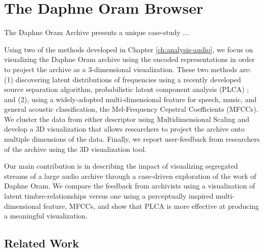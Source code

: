 \documentclass[a4paper,10pt,final]{ThesisStyle}
\begin{document}
\section{The Daphne Oram Browser}

The Daphne Oram Archive presents a unique case-study ...

Using two of the methods developed in Chapter \ref{ch:analysis-audio}, we focus on visualizing the Daphne Oram archive using the encoded representations in order to project the archive as a 3-dimensional visualization.  These two methods are: (1) discovering latent distributions of frequencies using a recently developed source separation algorithm, probabilistic latent component analysis (PLCA) \cite{SmaragdisRajShashanka}; and (2), using a widely-adopted multi-dimensional feature for speech, music, and general acoustic classification, the Mel-Frequency Cepstral Coefficients (MFCCs).  We cluster the data from either descriptor using Multidimensional Scaling and develop a 3D visualization that allows researchers to project the archive onto multiple dimensions of the data.  Finally, we report user-feedback from researchers of the archive using the 3D visualization tool.  

Our main contribution is in describing the impact of visualizing segregated streams of a large audio archive through a case-driven exploration of the work of Daphne Oram.  We compare the feedback from archivists using a visualization of latent timbre-relationships versus one using a perceptually inspired multi-dimensional feature, MFCCs, and show that PLCA is more effective at producing a meaningful visualization.  


\subsection{Related Work}
\end{document}
